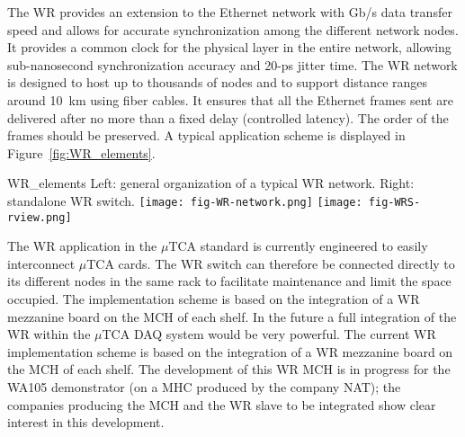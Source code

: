 The WR provides an extension to the Ethernet network with Gb/s data
transfer speed and allows for accurate synchronization among the different
network nodes. 
It provides a common clock for the physical layer in the entire
network, allowing sub-nanosecond synchronization accuracy and 20-ps
jitter time. The WR network is designed to host up to thousands of
nodes and to support distance ranges around 10~km using fiber cables. It
ensures that all the Ethernet frames sent are delivered
after no more than a fixed delay  (controlled latency). The order of the frames should be
preserved.  A typical application scheme is displayed
in Figure~\ref{fig:WR_elements}.
\begin{cdrfigure}{WR_elements}
{\small Left: general organization of a typical WR network. Right: standalone WR switch.}
\texttt{[image: fig-WR-network.png]}
\texttt{[image: fig-WRS-rview.png]}
\end{cdrfigure}

The WR application in the $\mu$TCA standard is currently engineered 
to easily interconnect $\mu$TCA cards.  The WR  switch
can therefore be connected directly to its different nodes in the same
rack to facilitate 
maintenance and limit the space occupied. 
The implementation scheme is based on the integration of a WR mezzanine board on the MCH
of each shelf. 
In the future  a full integration of the WR within the $\mu$TCA DAQ system would be very powerful. 
The current WR implementation scheme is based on the integration of a WR mezzanine board on the MCH of each shelf. 
The development of this WR MCH is in progress for the WA105
demonstrator (on a MHC produced by the company NAT); the companies
producing the MCH and the WR slave to be integrated show clear interest in this development.